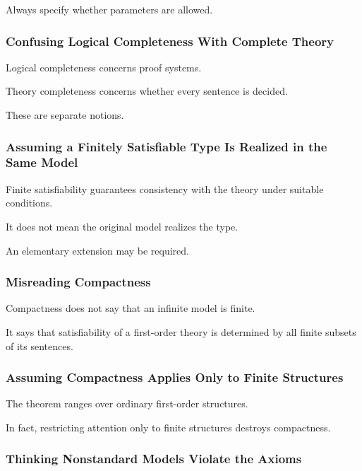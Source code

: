 Always specify whether parameters are allowed.

\subsubsection{Confusing Logical Completeness With Complete Theory}

Logical completeness concerns proof systems.

Theory completeness concerns whether every sentence is decided.

These are separate notions.

\subsubsection{Assuming a Finitely Satisfiable Type Is Realized in the Same Model}

Finite satisfiability guarantees consistency with the theory under suitable
conditions.

It does not mean the original model realizes the type.

An elementary extension may be required.

\subsubsection{Misreading Compactness}

Compactness does not say that an infinite model is finite.

It says that satisfiability of a first-order theory is determined by all
finite subsets of its sentences.

\subsubsection{Assuming Compactness Applies Only to Finite Structures}

The theorem ranges over ordinary first-order structures.

In fact, restricting attention only to finite structures destroys
compactness.

\subsubsection{Thinking Nonstandard Models Violate the Axioms}

